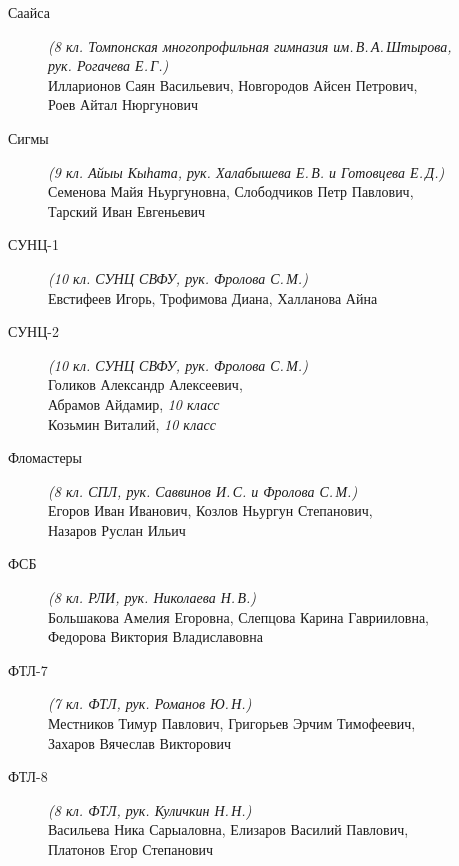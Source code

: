 \begin{description}
\item[Саайса] \textit{(8 кл. Томпонская многопрофильная гимназия им.\,В.\,А.\,Штырова, \\
рук. Рогачева Е.\,Г.)} \\
Илларионов Саян Васильевич, Новгородов Айсен Петрович, \\
Роев Айтал Нюргунович

\item[Сигмы] \textit{(9 кл. Айыы Кыһата, рук. Халабышева Е.\,В. и Готовцева Е.\,Д.)} \\
Семенова Майя Ньургуновна, Слободчиков Петр Павлович, \\
Тарский Иван Евгеньевич

\item[СУНЦ-1] \textit{(10 кл. СУНЦ СВФУ, рук. Фролова С.\,М.)} \\
Евстифеев Игорь, Трофимова Диана, Халланова Айна

\item[СУНЦ-2] \textit{(10 кл. СУНЦ СВФУ, рук. Фролова С.\,М.)} \\
Голиков Александр Алексеевич, \\
Абрамов Айдамир, \textit{10 класс} \\
Козьмин Виталий, \textit{10 класс}

\item[Фломастеры] \textit{(8 кл. СПЛ, рук. Саввинов И.\,С. и Фролова С.\,М.)} \\
Егоров Иван Иванович, Козлов Ньургун Степанович, \\
Назаров Руслан Ильич

\item[ФСБ] \textit{(8 кл. РЛИ, рук. Николаева Н.\,В.)} \\
Большакова Амелия Егоровна, Слепцова Карина Гаврииловна, \\
Федорова Виктория Владиславовна

\item[ФТЛ-7] \textit{(7 кл. ФТЛ, рук. Романов Ю.\,Н.)} \\
Местников Тимур Павлович, Григорьев Эрчим Тимофеевич, \\
Захаров Вячеслав Викторович

\item[ФТЛ-8] \textit{(8 кл. ФТЛ, рук. Куличкин Н.\,Н.)} \\
Васильева Ника Сарыаловна, Елизаров Василий Павлович, \\
Платонов Егор Степанович


\end{description}

